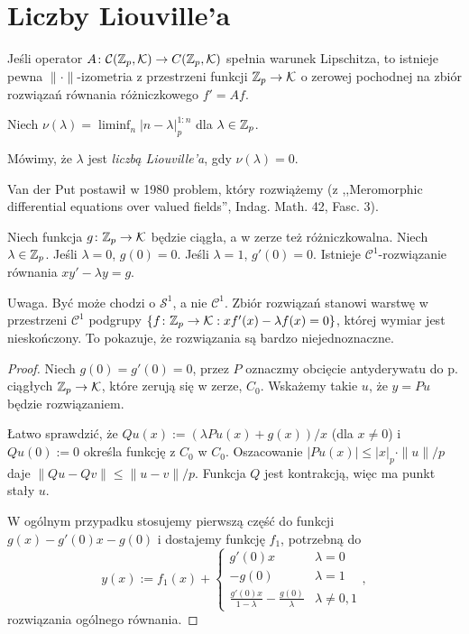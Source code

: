 \section{Liczby Liouville'a}
\begin{fakt} %
	Jeśli operator $A \colon \mathcal C(\mathbb Z_p, \mathcal K) \to C(\mathbb Z_p, \mathcal K)$ spełnia warunek Lipschitza, to istnieje pewna $\|\cdot\|$-izometria z przestrzeni funkcji $\mathbb Z_p \to \mathcal K$ o zerowej pochodnej na zbiór rozwiązań równania różniczkowego $f' = Af$.
\end{fakt}

\begin{definicja}
	Niech $\nu(\lambda) = \liminf_n |n - \lambda|_p^{1:n}$ dla $\lambda \in \mathbb Z_p$.
\end{definicja}

\begin{definicja}
	Mówimy, że $\lambda$ jest \emph{liczbą Liouville'a}, gdy $\nu(\lambda) = 0$.
\end{definicja}

Van der Put postawił w 1980 problem, który rozwiążemy (z ,,Meromorphic differential equations over valued fields'', Indag. Math. 42, Fasc. 3).

\begin{fakt}
	Niech funkcja $g \colon \mathbb Z_p \to \mathcal K$ będzie ciągła, a w zerze też różniczkowalna.
	Niech $\lambda \in \mathbb Z_p$.
	Jeśli $\lambda = 0$, $g(0) = 0$.
	Jeśli $\lambda = 1$, $g'(0) = 0$.
	Istnieje $\mathcal C^1$-rozwiązanie równania $x y' - \lambda y = g$.
\end{fakt}

Uwaga. 
Być może chodzi o $\mathcal S^1$, a nie $\mathcal C^1$.
Zbiór rozwiązań stanowi warstwę w przestrzeni $\mathcal C^1$ podgrupy $\{f \colon \mathbb Z_p \to \mathcal K : xf'(x) - \lambda f(x) = 0\}$, której wymiar jest nieskończony.
To pokazuje, że rozwiązania są bardzo niejednoznaczne.

\begin{proof}
	Niech $g(0) = g'(0) = 0$, przez $P$ oznaczmy obcięcie antyderywatu do p. ciągłych $\mathbb Z_p \to \mathcal K$, które zerują się w zerze, $C_0$.
	Wskażemy takie $u$, że $y = Pu$ będzie rozwiązaniem.

	Łatwo sprawdzić, że $Qu(x) := (\lambda Pu(x) + g(x))/x$ (dla $x \neq 0$) i $Qu(0) := 0$ określa funkcję z $C_0$ w $C_0$.
	Oszacowanie $|Pu(x)| \le |x|_p \cdot \|u\| / p$ daje $\|Qu - Qv\| \le \|u - v\| / p$.
	Funkcja $Q$ jest kontrakcją, więc ma punkt stały $u$.

	W ogólnym przypadku stosujemy pierwszą część do funkcji $g(x) - g'(0) x - g(0)$ i dostajemy funkcję $f_1$, potrzebną do
	\[
		y(x) := f_1(x) + \begin{cases}
		g'(0)x & \lambda = 0 \\
		-g(0) & \lambda = 1 \\
		\frac{g'(0) x}{1-  \lambda} - \frac{g(0)}{\lambda} & \lambda \neq 0, 1 \end{cases},
	\]
	rozwiązania ogólnego równania.
\end{proof}

